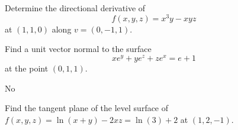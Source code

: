 \documentclass[openany]{book}
\begin{document}
\begin{prob}
    Determine the directional derivative of 
    \begin{equation*}
        f(x,y,z)=x^3y-xyz
    \end{equation*}
    at $(1,1,0)$ along $v=(0,-1,1)$.
\end{prob}
\newpage





\begin{prob}
    Find a unit vector normal to the surface
    \[xe^y+ye^z+ze^x=e+1\]
    at the point $(0,1,1)$. %
\end{prob}
No
\newpage






\begin{prob}
    Find the tangent plane of the level surface of $f(x,y,z)=\ln(x+y)-2xz=\ln(3)+2$ at $(1,2,-1)$.
\end{prob}
\end{document}

